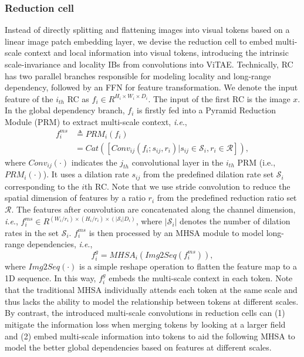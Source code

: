 \documentclass[twocolumn]{svjour3}          \smartqed  \usepackage{natbib}
\newcommand{\ie}{i.e}
\def\onedot{.\xspace}
\def\ie{\emph{i.e}\onedot}
\begin{document}
\subsubsection{Reduction cell}
Instead of directly splitting and flattening images into visual tokens based on a linear image patch embedding layer, we devise the reduction cell to embed multi-scale context and local information into visual tokens, introducing the intrinsic scale-invariance and locality IBs from convolutions into ViTAE. Technically, RC has two parallel branches responsible for modeling locality and long-range dependency, followed by an FFN for feature transformation. We denote the input feature of the $i_{th}$ RC as $f_i \in R^{H_i \times W_i \times D_i}$. The input of the first RC is the image $x$. In the global dependency branch, $f_i$ is firstly fed into a Pyramid Reduction Module (PRM) to extract multi-scale context, \ie,
\begin{equation}
\begin{aligned}
    f_i^{ms} &\triangleq PRM_i(f_i) \\ 
    &= Cat([Conv_{ij}(f_i; s_{ij}, r_{i}) | s_{ij} \in \mathcal{S}_i, r_{i} \in \mathcal{R}]),
\end{aligned}
\end{equation}
where $Conv_{ij}(\cdot)$ indicates the $j_{th}$ convolutional layer in the $i_{th}$ PRM (i.e., $PRM_i(\cdot)$). It uses a dilation rate $s_{ij}$ from the predefined dilation rate set $\mathcal{S}_i$ corresponding to the $i$th RC. Note that we use stride convolution to reduce the spatial dimension of features by a ratio $r_{i}$ from the predefined reduction ratio set $\mathcal{R}$. The features after convolution are concatenated along the channel dimension, \ie, $f_i^{ms} \in R^{(W_i/r_i) \times (H_i/r_i) \times (|\mathcal{S}_i|D_i)}$, where $|\mathcal{S}_i|$ denotes the number of dilation rates in the set $\mathcal{S}_i$. $f_i^{ms}$ is then processed by an MHSA module to model long-range dependencies, \ie, 
\begin{equation}
    f_i^{g} = MHSA_i(Img2Seq(f_i^{ms})),
\end{equation}
where $Img2Seq(\cdot)$ is a simple reshape operation to flatten the feature map to a 1D sequence. In this way, $f_i^{g}$ embeds the multi-scale context in each token. Note that the traditional MHSA individually attends each token at the same scale and thus lacks the ability to model the relationship between tokens at different scales. By contrast, the introduced multi-scale convolutions in reduction cells can (1) mitigate the information loss when merging tokens by looking at a larger field and (2) embed multi-scale information into tokens to aid the following MHSA to model the better global dependencies based on features at different scales. 
\end{document}
